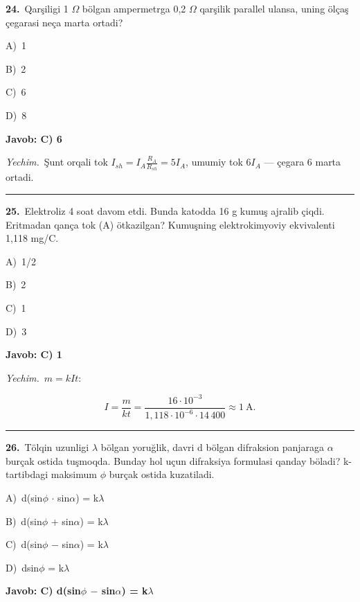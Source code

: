 \documentclass[11pt,a4paper]{article}
\newcommand{\opt}[2]{\hspace*{4mm}#1)\ #2\par}
\begin{document}
\noindent\begin{minipage}{\linewidth}
\textbf{24.}\ Qarşiligi 1 $\Omega$ bölgan ampermetrga 0,2 $\Omega$ qarşilik parallel ulansa, uning ölçaş çegarasi neça marta ortadi?\par\smallskip
\opt{A}{1}
\opt{B}{2}
\opt{C}{6}
\opt{D}{8}
\end{minipage}\vspace{2pt}\par
\noindent\colorbox{gray!12}{\parbox{\dimexpr\linewidth-2\fboxsep}{\textbf{Javob: C) 6}}}\par\smallskip
\noindent\textit{Yechim.}\ Şunt orqali tok $I_{sh}=I_A\frac{R_A}{R_{sh}}=5I_A$, umumiy tok $6I_A$ — çegara 6 marta ortadi.\par\par\medskip\hrule\medskip
{}\noindent\begin{minipage}{\linewidth}
\textbf{25.}\ Elektroliz 4 soat davom etdi. Bunda katodda 16 g kumuş ajralib çiqdi. Eritmadan qança tok (A) ötkazilgan? Kumuşning elektrokimyoviy ekvivalenti 1,118 mg/C.\par\smallskip
\opt{A}{1/2}
\opt{B}{2}
\opt{C}{1}
\opt{D}{3}
\end{minipage}\vspace{2pt}\par
\noindent\colorbox{gray!12}{\parbox{\dimexpr\linewidth-2\fboxsep}{\textbf{Javob: C) 1}}}\par\smallskip
\noindent\textit{Yechim.}\ $m=kIt$:\par
\[I=\frac{m}{kt}=\frac{16\cdot10^{-3}}{1{,}118\cdot10^{-6}\cdot14\,400}\approx1\ \text{A}.\]\par\medskip\hrule\medskip
{}\noindent\begin{minipage}{\linewidth}
\textbf{26.}\ Tölqin uzunligi $\lambda$ bölgan yoruğlik, davri d bölgan difraksion panjaraga $\alpha$ burçak ostida tuşmoqda. Bunday hol uçun difraksiya formulasi qanday böladi? k-tartibdagi maksimum $\phi$ burçak ostida kuzatiladi.\par\smallskip
\opt{A}{d(sin$\phi$ $\cdot$ sin$\alpha$) = k$\lambda$}
\opt{B}{d(sin$\phi$ + sin$\alpha$) = k$\lambda$}
\opt{C}{d(sin$\phi$ $-$ sin$\alpha$) = k$\lambda$}
\opt{D}{dsin$\phi$ = k$\lambda$}
\end{minipage}\vspace{2pt}\par
\noindent\colorbox{gray!12}{\parbox{\dimexpr\linewidth-2\fboxsep}{\textbf{Javob: C) d(sin$\phi$ $-$ sin$\alpha$) = k$\lambda$}}}\par\smallskip
\end{document}
